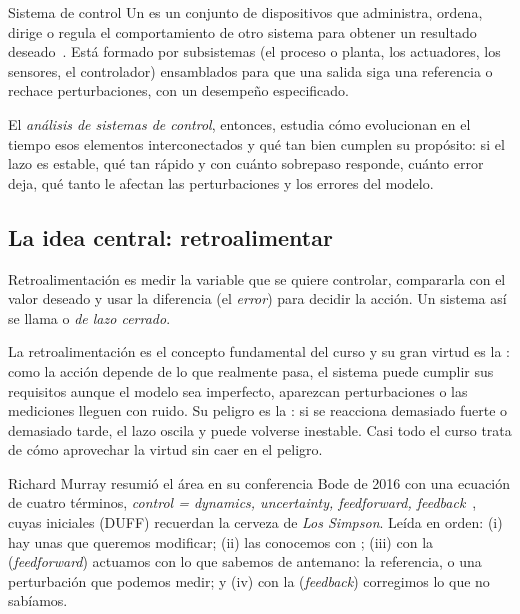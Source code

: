 \begin{definicion}[label=def:in-sistemacontrol]{Sistema de control}
Un  es un conjunto de dispositivos que administra, ordena, dirige o regula el comportamiento de otro sistema para obtener un resultado deseado~\citep{WikiControl}. Está formado por subsistemas (el proceso o planta, los actuadores, los sensores, el controlador) ensamblados para que una salida siga una referencia o rechace perturbaciones, con un desempeño especificado.
\end{definicion}

El \emph{análisis de sistemas de control}, entonces, estudia cómo evolucionan en el tiempo esos elementos interconectados y qué tan bien cumplen su propósito: si el lazo es estable, qué tan rápido y con cuánto sobrepaso responde, cuánto error deja, qué tanto le afectan las perturbaciones y los errores del modelo.

\subsection{La idea central: retroalimentar}

\begin{definicion}[label=def:in-retro]{Retroalimentación}
 es medir la variable que se quiere controlar, compararla con el valor deseado y usar la diferencia (el \emph{error}) para decidir la acción. Un sistema así se llama  o \emph{de lazo cerrado}.
\end{definicion}

La retroalimentación es el concepto fundamental del curso y su gran virtud es la : como la acción depende de lo que realmente pasa, el sistema puede cumplir sus requisitos aunque el modelo sea imperfecto, aparezcan perturbaciones o las mediciones lleguen con ruido. Su peligro es la : si se reacciona demasiado fuerte o demasiado tarde, el lazo oscila y puede volverse inestable. Casi todo el curso trata de cómo aprovechar la virtud sin caer en el peligro.

Richard Murray resumió el área en su conferencia Bode de 2016 con una ecuación de cuatro términos, \emph{control = dynamics, uncertainty, feedforward, feedback}~\citep{Mur16}, cuyas iniciales (DUFF) recuerdan la cerveza de \emph{Los Simpson}. Leída en orden: (i) hay unas  que queremos modificar; (ii) las conocemos con ; (iii) con la  (\emph{feedforward}) actuamos con lo que sabemos de antemano: la referencia, o una perturbación que podemos medir; y (iv) con la  (\emph{feedback}) corregimos lo que no sabíamos.

